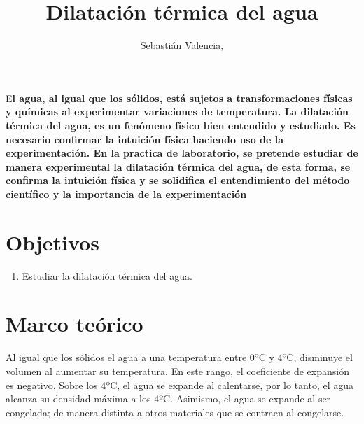 \documentclass[DIV=calc, paper=a4, fontsize=11pt, twocolumn, spanish]{scrartcl}	 %
\title{Dilatación térmica del agua} %
\author{Sebastián Valencia, } %
\date{} %
\newcommand{\initial}[1]{ %
\lettrine[lines=3,lhang=0.3,nindent=0em]{
\color{DarkGoldenrod}
{\textsf{#1}}}{}}
\begin{document}
\maketitle %

\thispagestyle{fancy} %


\initial{E}\textbf{l agua, al igual que los sólidos, está sujetos a transformaciones físicas y químicas al experimentar variaciones de temperatura. La dilatación térmica del agua, es un fenómeno físico bien entendido y estudiado. Es necesario confirmar la intuición física haciendo uso de la experimentación. En la practica de laboratorio, se pretende estudiar de manera experimental la dilatación térmica del agua, de esta forma, se confirma la intuición física y se  solidifica el entendimiento del método científico y la importancia de la experimentación}


\section*{Objetivos}

\begin{enumerate}
\item Estudiar la dilatación térmica del agua.
\end{enumerate}


\section*{Marco teórico}

Al igual que los sólidos el agua a una temperatura entre $0º$C y $4º$C, disminuye el volumen al aumentar su temperatura. En este rango, el coeficiente de expansión es negativo. Sobre los $4º$C, el agua se expande al calentarse, por lo tanto, el agua alcanza su densidad máxima a los $4º$C. Asimismo, el agua se expande al ser congelada; de manera distinta a otros materiales que se contraen al congelarse.\\
\end{document}
